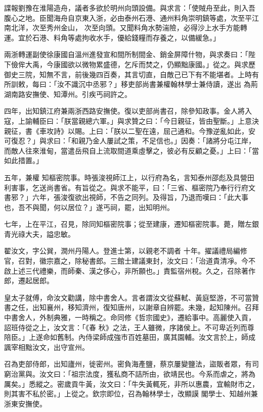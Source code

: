 \begin{pinyinscope}
 諜報劉豫在淮陽造舟，議者多欲於明州向頭設備。與求言：「使賊舟至此，則入吾腹心之地。臣聞海舟自京東入浙，必由泰州石港、通州料角崇明鎮等處，次至平江南北洋，次至秀州金山，
 次至向頭。又聞料角水勢湍險，必得沙上水手方能轉運。宜於石港、料角等處拘收水手，優給錢糧而存養之，以備緩急。」



 兩浙轉運副使徐康國自溫州進發宣和間所制間金、銷金屏障什物，與求奏曰：「陛下儉侔大禹，今康國欲以微物累盛德，乞斥而焚之，仍顯黜康國。」從之。與求歷御史三院，知無不言，前後幾四百奏，其言切直，自敵己已下有不能堪者。上時有所訓敕，每曰：「汝不識沉中丞邪？」移吏部尚書兼權翰林學士兼侍讀，遂出
 為荊湖南路安撫使、知潭州。引疾丐祠許之。



 四年，出知鎮江府兼兩浙西路安撫使。復以吏部尚書召，除參知政事。金人將入寇，上諭輔臣曰：「朕當親總六軍。」與求贊之曰：「今日親征，皆由聖斷。」上意決親征，書《車攻詩》以賜。上曰：「朕以二聖在遠，屈己通和。今豫逆亂如此，安可復忍？」與求曰：「和親乃金人屢試之策，不足信也。」因奏：「諸將分屯江岸，而敵人往來淮甸，當遣岳飛自上流取間道乘虛擊之，彼必有反顧之憂。」上曰：「當如此措置。」



 五年，兼權
 知樞密院事。時張浚視師江上，以行府為名，言知泰州邵彪及具營田利害事，乞送尚書省。有旨從之。與求不能平，曰：「三省、樞密院乃奉行行府文書邪？」六年，張浚復欲出視師，不告之同列。及得旨，乃退而嘆曰：「此大事也，吾不與聞，何以居位？」遂丐祠，罷，出知明州。



 七年，上在平江，召見，除同知樞密院事；從至建康，遷知樞密院事。薨，贈左銀青光祿大夫，謚忠敏。



 翟汝文，字公巽，潤州丹陽人。登進士第，以親老不調者
 十年。擢議禮局編修官，召對，徽宗嘉之，除秘書郎。三館士建議東封，汝文曰：「治道貴清凈。今不啟上述三代禮樂，而師秦、漢之侈心，非所願也。」責監宿州稅。久之，召除著作郎，遷起居郎。



 皇太子就傅，命汝文勸講，除中書舍人。言者謂汝文從蘇軾、黃庭堅游，不可當贊書之任，出知襄州，移知濟州，復知唐州，以謝章自辨罷。未幾，起知陳州。召拜中書舍人，外制典雅，一時稱之。命同修《哲宗國史》，遷給事中。高麗使入貢，詔班侍從之上，汝文言：「《春
 秋》之法，王人雖微，序諸侯上。不可卑近列而尊陪臣。」上遂命如舊制。內侍梁師成強市百姓墓田，廣其園輔。汝文言於上，師成諷宰相黜汝文，出守宣州。



 召為吏部侍郎，出知廬州，徙密州。密負海產鹽，蔡京屢變鹽法，盜販者眾，有司窮治黨與。汝文曰：「祖宗法度，獲私商不詰所由，欲靖民也。今系而虐之，將為厲矣。」悉縱之。密歲貢牛黃，汝文曰：「牛失黃輒死，非所以惠農，宜輸財市之，則其害不私於密。」上從之。欽宗即位，召為翰林學士，改顯謨
 閣學士、知越州兼浙東安撫使。




\end{pinyinscope}
